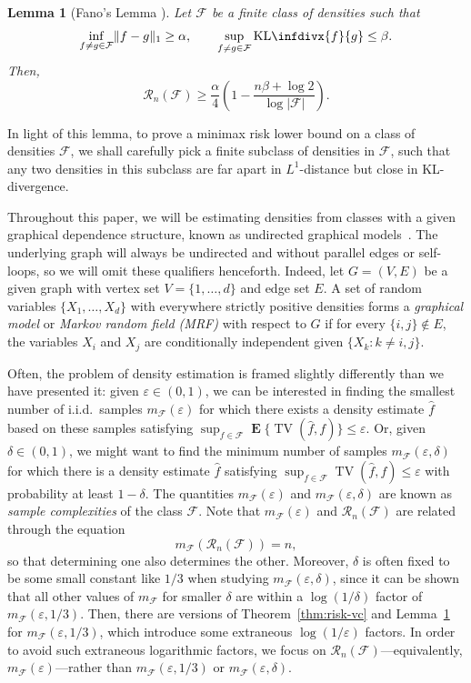 \documentclass[letterpaper]{amsart}
\newcommand{\infdiv}{\mathrm{KL}\infdivx}
\DeclarePairedDelimiter{\norm}{\lVert}{\rVert}
\newcommand{\sF}{\mathcal{F}}
\newcommand{\sR}{\mathcal{R}}
\DeclareMathOperator{\E}{\mathbf{E}}
\newcommand{\eps}{\varepsilon}
\DeclareMathOperator{\TV}{TV}
\let\originalleft\left
\let\originalright\right
\def\left#1{\mathopen{}\originalleft#1}
\def\right#1{\originalright#1\mathclose{}}
\newcommand{\thmref}[1]{Theorem~\ref{thm:#1}}
\numberwithin{thm}{section}
\newtheorem{lem}[thm]{Lemma}{\bfseries}{\itshape}
\newcommand{\lemlabel}[1]{\label{lem:#1}}
\newcommand{\lemref}[1]{Lemma~\ref{lem:#1}}
\theoremstyle{definition}
\theoremstyle{plain}
\begin{document}
\begin{lem}[Fano's Lemma ]\lemlabel{fano-lower}
  Let $\sF$ be a finite  class of densities such that
  \begin{align*}
    \inf_{f \neq g \in \sF} \norm{f - g}_1 \ge \alpha , \qquad \sup_{f \neq g \in \sF} \infdiv{f}{g} \le \beta .
  \end{align*}
  Then,
  \[
    \sR_n(\sF) \ge \frac{\alpha}{4} \left(1 - \frac{n \beta + \log 2}{\log |\sF|} \right) .
  \]
\end{lem}
In light of this lemma, to prove a minimax risk lower bound on a class
of densities $\sF$, we shall carefully pick a finite subclass of
densities in $\sF$, such that any two densities in this subclass are
far apart in $L^1$-distance but close in KL-divergence.

Throughout this paper, we will be estimating densities from classes
with a given graphical dependence structure, known as undirected
graphical models~\cite{graphical-models}. The underlying graph will
always be undirected and without parallel edges or self-loops, so we
will omit these qualifiers henceforth. Indeed, let $G = (V, E)$ be a
given graph with vertex set $V = \{1, \dots, d\}$ and edge set $E$. A
set of random variables $\{X_1, \dots, X_d\}$ with everywhere strictly
positive densities forms a \emph{graphical model} or \emph{Markov
  random field (MRF)} with respect to $G$ if for every
$\{i, j\} \not\in E$, the variables $X_i$ and $X_j$ are conditionally
independent given $\{X_k \colon k \neq i, j\}$.

Often, the problem of density estimation is framed slightly
differently than we have presented it: given $\eps \in (0, 1)$, we can
be interested in finding the smallest number of i.i.d.\ samples
$m_\sF(\eps)$ for which there exists a density estimate $\hat{f}$
based on these samples satisfying
$\sup_{f \in \sF} \E\{\TV(\hat{f}, f)\} \le \eps$. Or, given
$\delta \in (0, 1)$, we might want to find the minimum number of
samples $m_\sF(\eps, \delta)$ for which there is a density estimate
$\hat{f}$ satisfying $\sup_{f \in \sF} \TV(\hat{f}, f) \le \eps$ with
probability at least $1 - \delta$. The quantities $m_\sF(\eps)$ and
$m_\sF(\eps, \delta)$ are known as \emph{sample complexities} of the
class $\sF$. Note that $m_\sF(\eps)$ and $\sR_n(\sF)$ are related
through the equation
\[
  m_\sF(\sR_n(\sF)) = n ,
\]
so that determining one also determines the other. Moreover, $\delta$
is often fixed to be some small constant like $1/3$ when studying
$m_\sF(\eps, \delta)$, since it can be shown that all other values of
$m_\sF$ for smaller $\delta$ are within a $\log(1/\delta)$ factor of
$m_\sF(\eps, 1/3)$. Then, there are versions of \thmref{risk-vc} and
\lemref{fano-lower} for $m_\sF(\eps, 1/3)$, which introduce some
extraneous $\log(1/\eps)$ factors. In order to avoid such extraneous
logarithmic factors, we focus on $\sR_n(\sF)$---equivalently,
$m_\sF(\eps)$---rather than $m_\sF(\eps, 1/3)$ or
$m_\sF(\eps, \delta)$.
\end{document}
